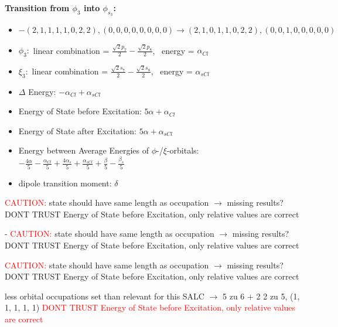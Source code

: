 \documentclass[12pt,a4paper]{article}
\begin{document}
        \noindent\textbf{Transition from $\phi_{3}$ into $\phi_{s_{3}}$:}
        \begin{itemize}
            \item $- (2, 1, 1, 1, 1, 0, 2, 2), (0, 0, 0, 0, 0, 0, 0, 0) \rightarrow (2, 1, 0, 1, 1, 0, 2, 2), (0, 0, 1, 0, 0, 0, 0, 0)$
        
            \item $\phi_{3}:$ linear combination = $\frac{\sqrt{2} p_{7}}{2} - \frac{\sqrt{2} p_{8}}{2}$, \
            energy = $\alpha_{Cl}$
            
            \item $\xi_{3}:$ linear combination = $\frac{\sqrt{2} s_{7}}{2} - \frac{\sqrt{2} s_{8}}{2}$, \
            energy = $\alpha_{s Cl}$
            
            \item $\Delta$ Energy: $- \alpha_{Cl} + \alpha_{s Cl}$
            \item Energy of State before Excitation: $5 \alpha + \alpha_{Cl}$
            \item Energy of State after Excitation: $5 \alpha + \alpha_{s Cl}$
            \item Energy between Average Energies of $\phi$-/$\xi$-orbitals: \
            $- \frac{4 \alpha}{5} - \frac{\alpha_{Cl}}{5} + \frac{4 \alpha_{s}}{5} + \frac{\alpha_{s Cl}}{5} + \frac{\beta}{5} - \frac{\beta_{s}}{5}$
        
            \item dipole transition moment: $\delta$
        
        \end{itemize}
        
	\textcolor{red}{CAUTION:} state should have same length as occupation $\rightarrow$ missing results?
	DONT TRUST \glqq{}Energy of State before Excitation\grqq{}, only relative values are correct

 - 	\textcolor{red}{CAUTION:} state should have same length as occupation $\rightarrow$ missing results?
	DONT TRUST \glqq{}Energy of State before Excitation\grqq{}, only relative values are correct

	\textcolor{red}{CAUTION:} state should have same length as occupation $\rightarrow$ missing results?
	DONT TRUST \glqq{}Energy of State before Excitation\grqq{}, only relative values are correct

less orbital occupations set than relevant for this SALC $\rightarrow$ 
5 zu 6 + 2 
2 zu 5, (1, 1, 1, 1, 1) 
\textcolor{red}{DONT TRUST \glqq{}Energy of State before Excitation\grqq{}, only relative values are correct}
\end{document}
